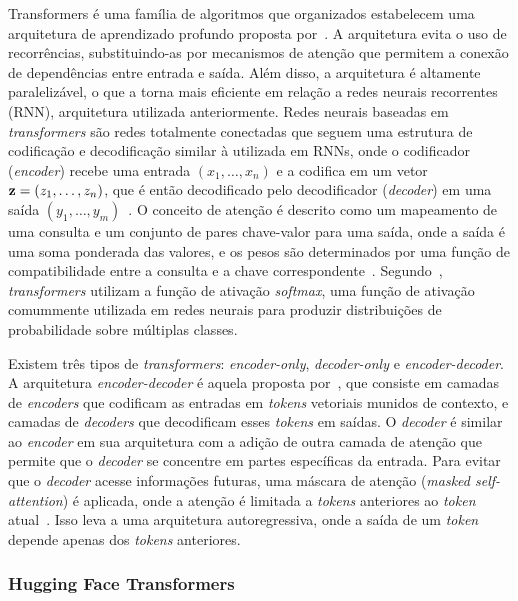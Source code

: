 \documentclass[journal]{IEEEtran}
\begin{document}
\noindent%
Transformers é uma família de algoritmos que organizados estabelecem uma arquitetura de aprendizado profundo proposta por~\cite{vaswani2017attention}.
A arquitetura evita o uso de recorrências, substituindo-as por mecanismos de atenção que permitem a conexão de dependências entre entrada e saída.
Além disso, a arquitetura é altamente paralelizável, o que a torna mais eficiente em relação a redes neurais recorrentes (RNN), arquitetura utilizada anteriormente.
Redes neurais baseadas em \textit{transformers} são redes totalmente conectadas que seguem uma estrutura de codificação e decodificação similar à utilizada em RNNs, onde o codificador (\textit{encoder}) recebe uma entrada $(x_1,\dotsc,x_n)$ e a codifica em um vetor $\text{\textbf{z}}=(z_1,\dotsc,z_n)$, que é então decodificado pelo decodificador (\textit{decoder}) em uma saída $(y_1,\dotsc,y_m)$~\cite{vaswani2017attention}.
O conceito de atenção é descrito como um mapeamento de uma consulta e um conjunto de pares chave-valor para uma saída, onde a saída é uma soma ponderada das valores, e os pesos são determinados por uma função de compatibilidade entre a consulta e a chave correspondente~\cite{vaswani2017attention}.
Segundo~\cite{vaswani2017attention}, \textit{transformers} utilizam a função de ativação \textit{softmax}, uma função de ativação comummente utilizada em redes neurais para produzir distribuições de probabilidade sobre múltiplas classes.

Existem três tipos de \textit{transformers}: \textit{encoder-only}, \textit{decoder-only} e \textit{encoder-decoder}.
A arquitetura \textit{encoder-decoder} é aquela proposta por~\cite{vaswani2017attention}, que consiste em camadas de \textit{encoders} que codificam as entradas em \textit{tokens} vetoriais munidos de contexto, e camadas de \textit{decoders} que decodificam esses \textit{tokens} em saídas.
O \textit{decoder} é similar ao \textit{encoder} em sua arquitetura com a adição de outra camada de atenção que permite que o \textit{decoder} se concentre em partes específicas da entrada.
Para evitar que o \textit{decoder} acesse informações futuras, uma máscara de atenção (\textit{masked self-attention}) é aplicada, onde a atenção é limitada a \textit{tokens} anteriores ao \textit{token} atual~\cite{vaswani2017attention}.
Isso leva a uma arquitetura autoregressiva, onde a saída de um \textit{token} depende apenas dos \textit{tokens} anteriores.

\subsubsection{Hugging Face Transformers}
\end{document}
